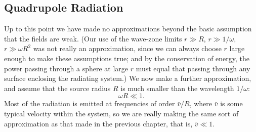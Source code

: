 
\subsection{Quadrupole Radiation}\label{sec:10.5}

Up to this point we have made no approximations beyond the basic assumption
that the fields are weak. (Our use of the wave-zone limits \(r\gg R\),
\(r\gg1/\omega\), \(r\gg\omega R^2\) was not really an approximation,
since we can always choose \(r\) large enough to make these assumptions true;
and by the conservation of energy, the power passing through a sphere at
large \(r\) must equal that passing through any surface enclosing the
radiating system.) We now make a further approximation, and assume that the
source radius \(R\) is much smaller than the wavelength \(1/\omega\):
\begin{equation}
  \omega R\ll1.
  \tag{10.5.1}\label{eq:10.5.1}
\end{equation}
Most of the radiation is emitted at frequencies of order
\(\bar v/R\), where \(\bar v\) is some typical velocity within the system,
so we are really making the same sort of approximation as that made in the
previous chapter, that is, \(\bar v\ll1\).

